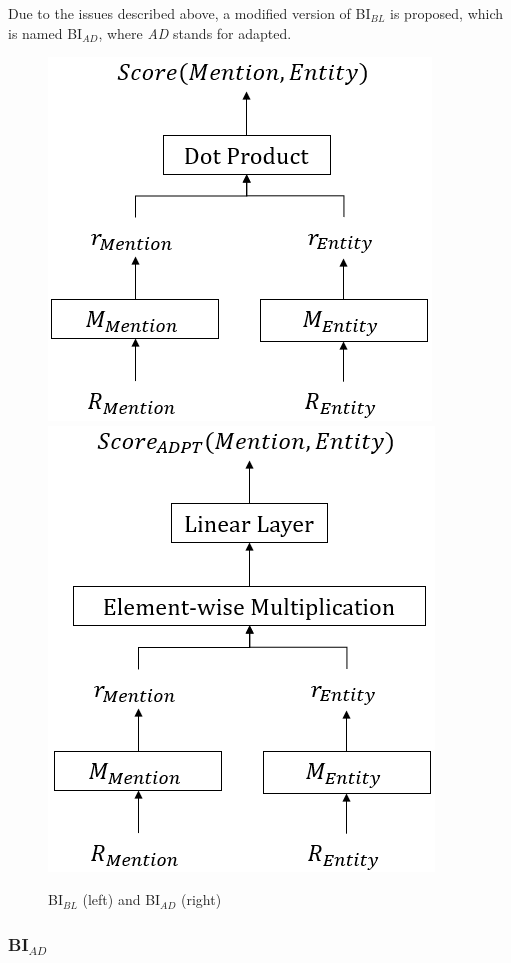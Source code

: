 \documentclass{report}
\theoremstyle{definition}
\theoremstyle{remark}
\begin{document}
Due to the issues described above, a modified version of BI$_{BL}$ is proposed, which is named BI$_{AD}$, where \textit{AD} stands for adapted.

\begin{figure}[H]
    \centering
    \includegraphics[scale=0.65]{BiencoderB.png}
    \hspace{1.5cm}
    \includegraphics[scale=0.65]{BiencoderADPT.png}
    \caption{BI$_{BL}$ (left) and BI$_{AD}$ (right)}
    \label{fig:biencoderB}
\end{figure}

\subsubsection{BI$_{AD}$}
\label{sec:biencoderadaptexplanation}
\end{document}
